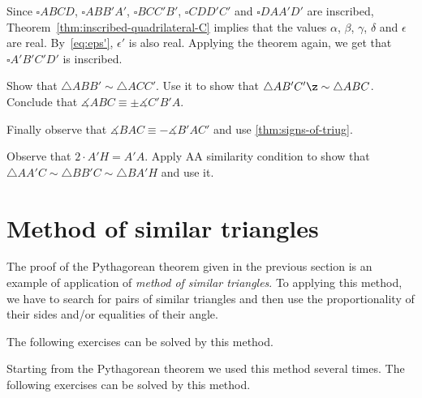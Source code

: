 {Since $\square ABCD$, $\square ABB'A'$, $\square BCC'B'$, $\square CDD'C'$ and $\square DAA'D'$ are inscribed, Theorem~\ref{thm:inscribed-quadrilateral-C} implies that the values $\alpha$, $\beta$, $\gamma$, $\delta$ and $\epsilon$ are real.
By~\ref{eq:eps'}, $\epsilon'$ is also real.
Applying the theorem again, we get that $\square A'B'C'D'$ is inscribed.
\qeds

















Show that $\triangle ABB'\sim\triangle ACC'$.
Use it to show that $\triangle AB'C'\z\sim\triangle ABC$.
Conclude that $\measuredangle ABC\equiv   \pm\measuredangle C'B'A$.

Finally observe that $\measuredangle BAC\equiv -\measuredangle B'AC'$ and use \ref{thm:signs-of-triug}.


Observe that $2\cdot A'H=A'A$.
Apply AA similarity condition to show that $\triangle AA'C\sim\triangle BB'C \sim\triangle BA'H$  and use it.











\section*{Method of similar triangles}

The proof of the Pythagorean theorem given in the previous section is an example of application of \emph{method of similar triangles}.
To applying this method, we have to search for pairs of similar triangles and then use the proportionality of their sides and/or equalities of their angle.

The following exercises can be solved by this method.

\begin{thm}{Exercise}
Let $ABC$ be acute triangle,
$B'$ and $C'$ be the foot points of $B$ and $C$ on the sides $[AC]$ and ${ 
\end{thm}




Starting from the Pythagorean theorem we used this method several times.
The following exercises can be solved by this method.

}
